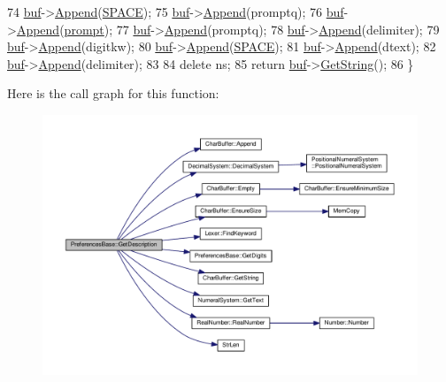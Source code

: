 \begin{DoxyCode}
74     \hyperlink{classPreferencesBase_a56ccdce81b9347c99eacb1839cee0a49}{buf}->\hyperlink{classCharBuffer_a045b38735f7b3007c1b98d3d7b7feafe}{Append}(\hyperlink{platform_8h_a5ff6e798033f03e74730e99f01936f84}{SPACE});
75     \hyperlink{classPreferencesBase_a56ccdce81b9347c99eacb1839cee0a49}{buf}->\hyperlink{classCharBuffer_a045b38735f7b3007c1b98d3d7b7feafe}{Append}(promptq);
76     \hyperlink{classPreferencesBase_a56ccdce81b9347c99eacb1839cee0a49}{buf}->\hyperlink{classCharBuffer_a045b38735f7b3007c1b98d3d7b7feafe}{Append}(\hyperlink{classPreferencesBase_a88a6af58103e0498c366d61a628312e0}{prompt});
77     \hyperlink{classPreferencesBase_a56ccdce81b9347c99eacb1839cee0a49}{buf}->\hyperlink{classCharBuffer_a045b38735f7b3007c1b98d3d7b7feafe}{Append}(promptq);
78     \hyperlink{classPreferencesBase_a56ccdce81b9347c99eacb1839cee0a49}{buf}->\hyperlink{classCharBuffer_a045b38735f7b3007c1b98d3d7b7feafe}{Append}(delimiter);
79     \hyperlink{classPreferencesBase_a56ccdce81b9347c99eacb1839cee0a49}{buf}->\hyperlink{classCharBuffer_a045b38735f7b3007c1b98d3d7b7feafe}{Append}(digitkw);
80     \hyperlink{classPreferencesBase_a56ccdce81b9347c99eacb1839cee0a49}{buf}->\hyperlink{classCharBuffer_a045b38735f7b3007c1b98d3d7b7feafe}{Append}(\hyperlink{platform_8h_a5ff6e798033f03e74730e99f01936f84}{SPACE});
81     \hyperlink{classPreferencesBase_a56ccdce81b9347c99eacb1839cee0a49}{buf}->\hyperlink{classCharBuffer_a045b38735f7b3007c1b98d3d7b7feafe}{Append}(dtext);
82     \hyperlink{classPreferencesBase_a56ccdce81b9347c99eacb1839cee0a49}{buf}->\hyperlink{classCharBuffer_a045b38735f7b3007c1b98d3d7b7feafe}{Append}(delimiter);
83 
84     \textcolor{keyword}{delete} ns;
85     \textcolor{keywordflow}{return} \hyperlink{classPreferencesBase_a56ccdce81b9347c99eacb1839cee0a49}{buf}->\hyperlink{classCharBuffer_a7dfd3feaaf80f318ba44efe15b1ec44b}{GetString}();
86 \}
\end{DoxyCode}


Here is the call graph for this function\+:\nopagebreak
\begin{figure}[H]
\begin{center}
\leavevmode
\includegraphics[width=350pt]{classPreferencesBase_a9452038c67c6592334b6f3908c86833a_cgraph}
\end{center}
\end{figure}




